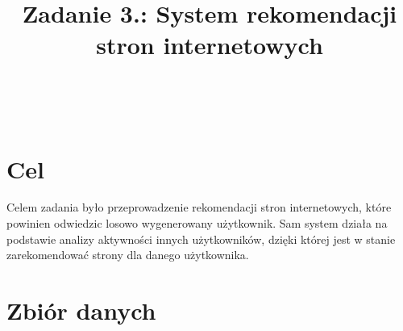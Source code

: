 \documentclass{classrep}
\author{%
    \studentinfo[239671@edu.p.lodz.pl]{Jan Karwowski}{239671}\\
    \studentinfo[239676@edu.p.lodz.pl]{Kamil Kowalewski}{239676}\\
}
\title{Zadanie 3.: System rekomendacji stron internetowych}
\begin{document}
    \maketitle
    \thispagestyle{fancyplain}

    \tableofcontents
    \newpage

    \section{Cel} {
        Celem zadania było przeprowadzenie rekomendacji stron internetowych, które
        powinien odwiedzic losowo wygenerowany użytkownik. Sam system działa na
        podstawie analizy aktywności innych użytkowników, dzięki której jest w stanie
        zarekomendować strony dla danego użytkownika.
    }

    \section{Zbiór danych}
\end{document}
